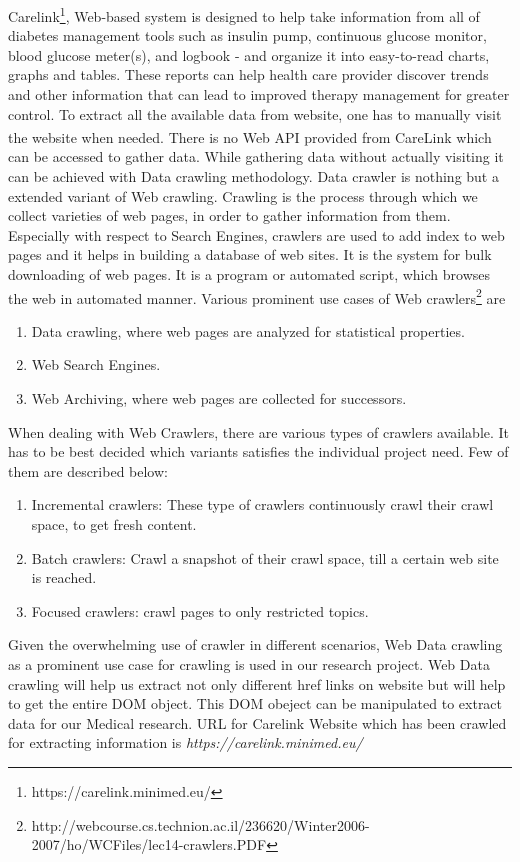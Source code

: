 \documentclass[article,type=msc,colorback,accentcolor=tud9c,twoside,11pt]{tudthesis}
\begin{document}
Carelink\footnote{https://carelink.minimed.eu/}, Web-based system is designed to help take information from all of diabetes management tools such as insulin pump, continuous glucose monitor, blood glucose meter(s), and logbook - and organize it into easy-to-read charts, graphs and tables. These reports can help health care provider discover trends and other information that can lead to improved therapy management for greater control. To extract all the available data from website, one has to manually visit the website when needed. There is no Web API provided from CareLink\textsuperscript{\textregistered} which can be accessed to gather data. While gathering data without actually visiting it can be achieved with Data crawling methodology. Data crawler is nothing but a extended variant of Web crawling. Crawling is the process through which we collect varieties of web pages, in order to gather information from them. Especially with respect to Search Engines, crawlers are used to add index to web pages and it helps in building a database of web sites. It is the system for bulk downloading of web pages. It is a program or automated script, which browses the web in automated manner. Various prominent use cases of Web crawlers\footnote{http://webcourse.cs.technion.ac.il/236620/Winter2006-2007/ho/WCFiles/lec14-crawlers.PDF} are
\begin{enumerate}
\item	Data crawling, where web pages are analyzed for statistical properties.
\item	Web Search Engines.
\item	Web Archiving, where web pages are collected for successors.
\end{enumerate}
When dealing with Web Crawlers, there are various types of crawlers available. It has to be best decided which variants satisfies the individual project need. Few of them are described below:
\begin{enumerate}
\item	Incremental crawlers: These type of crawlers continuously crawl their crawl space, to get fresh content.
\item	Batch crawlers: Crawl a snapshot of their crawl space, till a certain web site is reached.
\item	Focused crawlers: crawl pages to only restricted topics.
\end{enumerate}
Given the overwhelming use of crawler in different scenarios, Web Data crawling as a prominent use case for crawling is used in our research project. Web Data crawling will help us extract not only different href links on website but will help to get the entire DOM object. This DOM obeject can be manipulated to extract data for our Medical research. URL for Carelink Website which has been crawled for extracting information is \textit{https://carelink.minimed.eu/}
\end{document}
